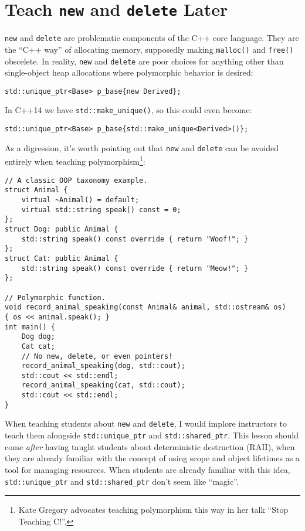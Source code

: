 \documentclass{article}
\newcommand{\CppNew}{\lstinline{new}}
\newcommand{\CppDelete}{\lstinline{delete}}
\newcommand{\NewAndDelete}{\CppNew{} and \CppDelete{}}
\begin{document}
\section*{Teach \CppNew{} and \CppDelete{} Later}
\CppNew{} and \CppDelete{} are problematic components of the C++ core language.  They are the ``C++ way'' of allocating memory, supposedly making \lstinline{malloc()} and \lstinline{free()} obscelete.  In reality, \CppNew{} and \CppDelete{} are poor choices for anything other than single-object heap allocations where polymorphic behavior is desired:
\begin{lstlisting}
std::unique_ptr<Base> p_base{new Derived};
\end{lstlisting}
In C++14 we have \lstinline{std::make_unique()}, so this could even become:
\begin{lstlisting}
std::unique_ptr<Base> p_base{std::make_unique<Derived>()};
\end{lstlisting}

As a digression, it's worth pointing out that \NewAndDelete{} can be avoided entirely when teaching polymorphism\footnote{Kate Gregory advocates teaching polymorphism this way in her talk ``Stop Teaching C!''.}:

\begin{lstlisting}
// A classic OOP taxonomy example.
struct Animal {
	virtual ~Animal() = default;
	virtual std::string speak() const = 0;
};
struct Dog: public Animal {
	std::string speak() const override { return "Woof!"; }
};
struct Cat: public Animal {
	std::string speak() const override { return "Meow!"; }
};

// Polymorphic function.
void record_animal_speaking(const Animal& animal, std::ostream& os)
{ os << animal.speak(); }
int main() {
	Dog dog;
	Cat cat;
	// No new, delete, or even pointers!
	record_animal_speaking(dog, std::cout);
	std::cout << std::endl;
	record_animal_speaking(cat, std::cout);
	std::cout << std::endl;
}
\end{lstlisting}

When teaching students about \NewAndDelete{}, I would implore instructors to teach them alongside \lstinline{std::unique_ptr} and \lstinline{std::shared_ptr}.  This lesson should come \emph{after} having taught students about deterministic destruction (RAII), when they are already familiar with the concept of using scope and object lifetimes as a tool for managing resources.  When students are already familiar with this idea, \lstinline{std::unique_ptr} and \lstinline{std::shared_ptr} don't seem like ``magic''.  
\end{document}
